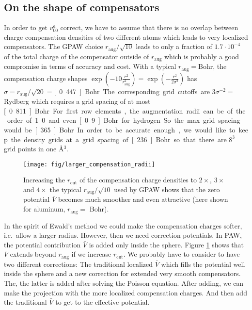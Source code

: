 \documentclass[oribibl]{llncs}
\newcommand{\um}[1]{_{\mathrm{#1}}}
\begin{document}
\subsection{On the shape of compensators}\label{sec:compensator-radii}
In order to get $v^a_{00}$ correct, we have to assume that there is no overlap
between charge compensation densities of two different atoms
which leads to very localized compensators.
The GPAW choice $r\um{aug}/\sqrt{10}$ leads to only a fraction of $1.7\cdot 10^{-4}$ of the total charge of the compensator
outside of $r\um{aug}$ which is probably a good compromise in terms of accuracy and cost.
With a typical $r\um{aug} =$\unit[2]{Bohr}, the compensation charge shapes
$\exp(-10\frac{r^2}{r\um{aug}^2}) = \exp(-\frac{r^2}{2 \sigma^2})$
has $\sigma = r\um{aug}/\sqrt{20} = $\unit[0.447]{Bohr}.
The corresponding grid cutoffs are $3\sigma^{-2} = $\unit[15]{Rydberg}
which requires a grid spacing of at most \unit[0.811]{Bohr}.
For first row elements, the augmentation radii can be 
of the order of 1.0 and even \unit[0.9]{Bohr} for hydrogen.
So the max.~grid spacing would be \unit[.365]{Bohr}.
In order to be accurate enough, we would like to
keep the density grids at a grid spacing of \unit[.236]{Bohr}
so that there are $8^3$ grid points in one \AA$^3$.


%
\begin{figure}
  \begin{minipage}[c]{.990\textwidth}
	\texttt{[image: fig/larger\_compensation\_radii]} %
  \end{minipage}\hfill
  \begin{minipage}[c]{.009\textwidth}
  \end{minipage}
  \label{fig:larger_compensation_radii}
  \caption{
	Increasing the $r\um{cut}$ of the compensation charge densities
	to $2\times$, $3\times$ and $4\times$ the typical $r\um{aug}/\sqrt{10}$
	used by GPAW shows that the zero potential $\bar V$ becomes much smoother
	and even attractive (here shown for aluminum, $r\um{aug} =$ \unit[2]{Bohr}).
  }
\end{figure}
%
%
In the spirit of Ewald's method we could make the compensation charges
softer, i.e.~allow a larger radius. However, then we need correction
potentials.
In PAW, the potential contribution $\bar V$ is added only inside the sphere.
Figure \ref{fig:larger_compensation_radii} shows that $\bar V$ extends beyond
$r\um{aug}$ if we increase $r\um{cut}$.
We probably have to consider to have two different corrections:
The traditional localized $\bar V$ which fills the potential well inside the sphere
and a new correction for extended very smooth compensators.
The, the latter is added after solving the Poisson equation.
After adding, we can make the projection with the more localized compensation charges.
And then add the traditional $\bar V$ to get to the effective potential.
\end{document}

